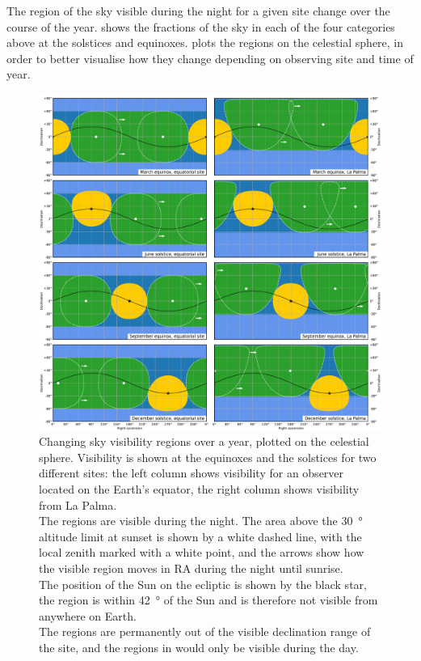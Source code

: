 \begin{colsection}
\begin{colsection}
The region of the sky visible during the night for a given site change over the course of the year.  shows the fractions of the sky in each of the four categories above at the solstices and equinoxes.  plots the regions on the celestial sphere, in order to better visualise how they change depending on observing site and time of year.

\begin{figure}[p]
    \begin{center}
        \includegraphics[width=\linewidth]{images/visibility.pdf}
    \end{center}
    \caption[Plotting sky visibility regions over a year]{
        Changing sky visibility regions over a year, plotted on the celestial sphere.
        Visibility is shown at the equinoxes and the solstices for two different sites: the left column shows visibility for an observer located on the Earth's equator, the right column shows visibility from La Palma. \\
        The  regions are visible during the night. The area above the \SI{30}{\degree} altitude limit at sunset is shown by a white dashed line, with the local zenith marked with a white point, and the arrows show how the visible region moves in RA during the night until sunrise. \\
        The position of the Sun on the ecliptic is shown by the black star, the  region is within \SI{42}{\degree} of the Sun and is therefore not visible from anywhere on Earth. \\
        The  regions are permanently out of the visible declination range of the site, and the regions in  would only be visible during the day.
    }\label{fig:visibility}
\end{figure}


\end{colsection}
\end{colsection}
